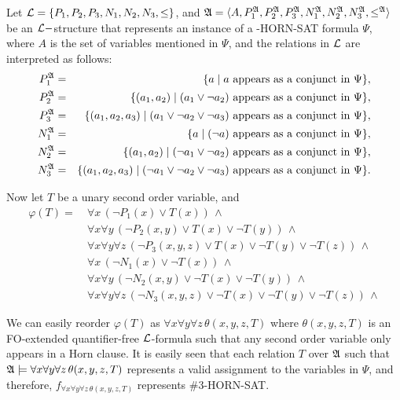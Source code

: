 Let ${\cal L} = \{P_1,P_2,P_3,N_1,N_2,N_3,\leq\}$, and ${\frak A} = \langle A, P_1^{\frak A},P_2^{\frak A},P_3^{\frak A},N_1^{\frak A},N_2^{\frak A},N_3^{\frak A}, \leq^{\frak A} \rangle$ be an ${\cal L}-$structure that represents an instance of a {-HORN-SAT} formula $\Psi$, where $A$ is the set of variables mentioned in $\Psi$, and the relations in ${\cal L}$ are interpreted as follows:
\begin{eqnarray*}
P_1^{\frak A} &=& \{a\mid a \mbox{ appears as a conjunct in }\Psi\},\\
P_2^{\frak A} &=& \{(a_1,a_2)\mid (a_1\vee \neg a_2) \mbox{ appears as a conjunct in }\Psi\},\\
P_3^{\frak A} &=& \{(a_1,a_2,a_3)\mid (a_1\vee \neg a_2\vee \neg a_3) \mbox{ appears as a conjunct in }\Psi\},\\
N_1^{\frak A} &=& \{a\mid (\neg a) \mbox{ appears as a conjunct in }\Psi\},\\
N_2^{\frak A} &=& \{(a_1,a_2)\mid (\neg a_1\vee \neg a_2) \mbox{ appears as a conjunct in }\Psi\},\\
N_3^{\frak A} &=& \{(a_1,a_2,a_3)\mid (\neg a_1\vee \neg a_2\vee \neg a_3) \mbox{ appears as a conjunct in }\Psi\}.
\end{eqnarray*}

Now let $T$ be a unary second order variable, and
\begin{align*}
\varphi(T) =\ &\forall x\, (\neg P_1(x) \vee T(x))\,\wedge\\
&\forall x\forall y\, (\neg P_2(x,y) \vee T(x) \vee \neg T(y))\,\wedge\\
&\forall x\forall y\forall z\, (\neg P_3(x,y,z) \vee T(x) \vee \neg T(y) \vee \neg T(z))\,\wedge\\
&\forall x\, (\neg N_1(x) \vee \neg T(x))\,\wedge\\
&\forall x\forall y\, (\neg N_2(x,y) \vee \neg T(x) \vee \neg T(y))\,\wedge\\
&\forall x\forall y\forall z\, (\neg N_3(x,y,z) \vee \neg T(x) \vee \neg T(y) \vee \neg T(z))\,\wedge
\end{align*}

We can easily reorder $\varphi(T)$ as $\forall x \forall y \forall z\,\theta(x,y,z,T)$ where $\theta(x,y,z,T)$ is an {\sc FO}-extended quantifier-free ${\cal L}$-formula such that any second order variable only appears in a Horn clause. It is easily seen that each relation $T$ over ${\frak A}$ such that ${\frak A}\models\forall x \forall y \forall z\,\theta(x,y,z,T)$ represents a valid assignment to the variables in $\Psi$, and therefore, $f_{\forall x \forall y \forall z\,\theta(x,y,z,T)}$ represents {\sc \#3-HORN-SAT}.


